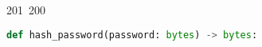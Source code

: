 201~200~\documentclass{article}
\begin{document}
\begin{lstlisting}[language=Python, caption=Server Password Hashing with SHA3-512]
	                                                                                                                                                                                                                                                                                                	                                                                                                                                        	    	                                                                                                	                                                                                                                                                                                                                                                                                                                                	                                                                        	                                                                        	                                                                                                                                        	                                                                                        def hash_password(password: bytes) -> bytes:
	                                                                                                                                                                                                                                                                                                	                                                                                                                                        	    	                                                                                                	                                                                                                                                                                                                                                                                                                                                	                                                                        	                                                                        	                                                                                                                                        	                                                                                            """

\end{lstlisting}
\end{document}
